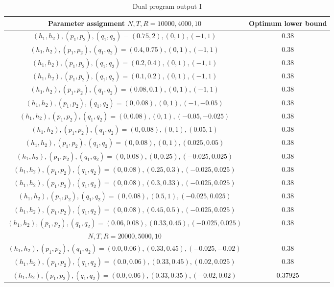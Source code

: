 \documentclass[12pt]{article}
\numberwithin{equation}{section}
\begin{document}
\begin{table}[h!] \centering
\begin{scriptsize}

 \begin{tabular}{| c |c |} 
 \hline
          \makecell{Parameter assignment \\ $N,T ,R= 10000,4000,10$ }  & Optimum lower bound \\
 \hline
 \hline
 $(h_1,h_2) ,(p_1,p_2),(q_1,q_2 )=(0.75,2),(0,1),(-1,1) $ & 0.38\\
 \hline
 $(h_1,h_2) ,(p_1,p_2),(q_1,q_2 )=(0.4,0.75),(0,1),(-1,1) $ & 0.38\\
 \hline
 $(h_1,h_2) ,(p_1,p_2),(q_1,q_2 )=(0.2,0.4),(0,1),(-1,1) $ & 0.38\\
 \hline
 $(h_1,h_2) ,(p_1,p_2),(q_1,q_2 )=(0.1,0.2),(0,1),(-1,1) $ & 0.38\\
 \hline
 $(h_1,h_2) ,(p_1,p_2),(q_1,q_2 )=(0.08,0.1),(0,1),(-1,1) $ & 0.38\\
 \hline
 $(h_1,h_2) ,(p_1,p_2),(q_1,q_2 )=(0,0.08),(0,1),(-1,-0.05) $ & 0.38\\
 \hline
 $(h_1,h_2) ,(p_1,p_2),(q_1,q_2 )=(0,0.08),(0,1),(-0.05,-0.025) $ & 0.38\\
 \hline
  $(h_1,h_2) ,(p_1,p_2),(q_1,q_2 )=(0,0.08),(0,1),(0.05,1) $ & 0.38\\
 \hline
 $(h_1,h_2) ,(p_1,p_2),(q_1,q_2 )=(0,0.08),(0,1),(0.025,0.05) $ & 0.38\\
 \hline
 $(h_1,h_2) ,(p_1,p_2),(q_1,q_2 )=(0,0.08),(0,0.25),(-0.025,0.025) $ & 0.38\\
\hline
 $(h_1,h_2) ,(p_1,p_2),(q_1,q_2 )=(0,0.08),(0.25,0.3),(-0.025,0.025) $ & 0.38\\
\hline
$(h_1,h_2) ,(p_1,p_2),(q_1,q_2 )=(0,0.08),(0.3,0.33),(-0.025,0.025) $ & 0.38\\
\hline
$(h_1,h_2) ,(p_1,p_2),(q_1,q_2 )=(0,0.08),(0.5,1),(-0.025,0.025) $ & 0.38\\
\hline
$(h_1,h_2) ,(p_1,p_2),(q_1,q_2 )=(0,0.08),(0.45,0.5),(-0.025,0.025) $ & 0.38\\
\hline
$(h_1,h_2) ,(p_1,p_2),(q_1,q_2 )=(0.06,0.08),(0.33,0.45),(-0.025,0.025) $ & 0.38\\
\hline
$N,T,R = 20000,5000,10$ & \\
\hline
\hline
$(h_1,h_2) ,(p_1,p_2),(q_1,q_2 )=(0.0,0.06),(0.33,0.45),(-0.025,-0.02) $ &0.38 \\
\hline
$(h_1,h_2) ,(p_1,p_2),(q_1,q_2 )=(0.0,0.06),(0.33,0.45),(0.02,0.025) $ &0.38 \\
\hline
$(h_1,h_2) ,(p_1,p_2),(q_1,q_2 )=(0.0,0.06),(0.33,0.35),(-0.02,0.02) $ &0.37925 \\
\hline

\end{tabular}
\end{scriptsize}

\caption{Dual program output I}
\label{dprogout}
\end{table}
\end{document}
